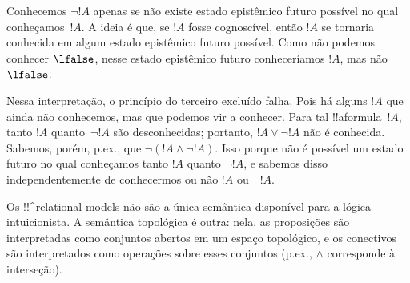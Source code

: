 \documentclass[../../../include/open-logic-section]{subfiles}
\begin{document}
Conhecemos $\lnot !A$ apenas se não existe estado epistêmico futuro
possível no qual conheçamos~$!A$. A ideia é que, se $!A$ fosse
cognoscível, então $!A$ se tornaria conhecida em algum estado
epistêmico futuro possível. Como não podemos conhecer $\lfalse$, nesse
estado epistêmico futuro conheceríamos $!A$, mas não~$\lfalse$.

Nessa interpretação, o princípio do terceiro excluído falha. Pois há
alguns $!A$ que ainda não conhecemos, mas que podemos vir a conhecer.
Para tal !!a{formula}~$!A$, tanto $!A$ quanto~$\lnot !A$ são
desconhecidas; portanto, $!A \lor \lnot !A$ não é conhecida. Sabemos,
porém, p.ex., que $\lnot(!A \land \lnot !A)$. Isso porque não é
possível um estado futuro no qual conheçamos tanto $!A$ quanto
$\lnot !A$, e sabemos disso independentemente de conhecermos ou não
$!A$ ou $\lnot !A$.

Os !!^{relational model}s não são a única semântica disponível para a
lógica intuicionista. A semântica topológica é outra: nela, as
proposições são interpretadas como conjuntos abertos em um espaço
topológico, e os conectivos são interpretados como operações sobre
esses conjuntos (p.ex., $\land$ corresponde à interseção).
\end{document}
